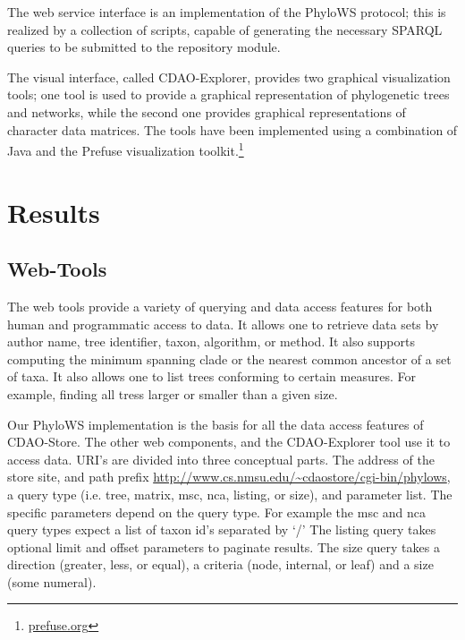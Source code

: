 \documentclass[10pt]{bmc_article}
\newenvironment{bmcformat}{\fussy\setboolean{publ}{true}}{\fussy}
\begin{document}
\begin{bmcformat}
The web service interface is an implementation of the PhyloWS protocol; this is realized by a collection of
scripts, capable of generating the necessary SPARQL queries to be submitted to the repository module.

The visual interface, called CDAO-Explorer, provides two graphical visualization tools; one tool is used to
provide a graphical representation of phylogenetic trees and networks, while the second one provides graphical
representations of character data matrices. The tools have been implemented using a combination of Java
and the Prefuse visualization toolkit.\footnote{\url{prefuse.org}}



 
\section*{Results}
  \subsection*{Web-Tools}
  The web tools provide a variety of querying and data access features for both
human and programmatic access to data. It allows one to retrieve data sets by
author name, tree identifier, taxon, algorithm, or method. It also supports
computing the minimum spanning clade or the nearest common ancestor of a set of
taxa. It also allows one to  list trees conforming to certain measures. For
example, finding all tress larger or smaller than a given size. 

   Our PhyloWS implementation is the basis for all the data access features of
CDAO-Store. The other web components, and the CDAO-Explorer tool use it to
access data. URI's are divided into three conceptual parts. The address of the
store site, and path prefix
\url{http://www.cs.nmsu.edu/~cdaostore/cgi-bin/phylows}, a query type (i.e.
tree, matrix, msc, nca, listing, or size), and parameter list. The specific
parameters depend on the query type. For example the msc and nca query types
expect a list of taxon id's separated by `/' The listing query takes optional
limit and offset parameters to paginate results. The size query takes a
direction (greater, less, or equal),  a criteria (node, internal, or leaf) and
a size (some numeral).


\end{bmcformat}
\end{document}
